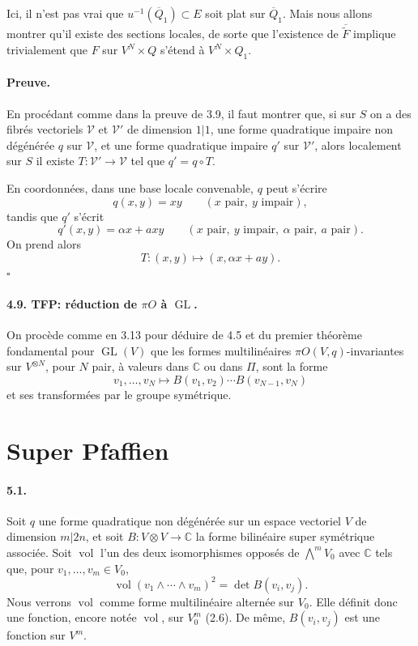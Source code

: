 \documentclass[11pt]{article}
\newcommand{\C}{\mathbb C}
\newcommand{\GL}{\operatorname{GL}}
\newcommand{\barQ}{\overline Q}
\begin{document}
Ici, il n'est pas vrai que $u^{-1}(\barQ_1)\subset E$ soit plat sur $\barQ_1$. Mais nous allons montrer qu'il existe des sections locales, de sorte que l'existence de $\overline{\widetilde F}$ implique trivialement que $F$ sur $V^N\times Q$ s'étend à $V^N\times Q_1$.

\paragraph{Preuve.}
En procédant comme dans la preuve de 3.9, il faut montrer que, si sur $S$ on a des fibrés vectoriels $\mathcal V$ et $\mathcal V'$ de dimension $1|1$, une forme quadratique impaire non dégénérée $q$ sur $\mathcal V$, et une forme quadratique impaire $q'$ sur $\mathcal V'$, alors localement sur $S$ il existe $T:\mathcal V'\to\mathcal V$ tel que $q'=q\circ T$.

En coordonnées, dans une base locale convenable, $q$ peut s'écrire
\[
q(x,y)=xy\qquad (x\text{ pair},\ y\text{ impair}),
\]
tandis que $q'$ s'écrit
\[
q'(x,y)=\alpha x+axy\qquad (x\text{ pair},\ y\text{ impair},\ \alpha\text{ pair},\ a\text{ pair}).
\]
On prend alors
\[
T:(x,y)\longmapsto (x,\alpha x+ay).
\]
\hfill $\square$

\paragraph{4.9. TFP: réduction de $\pi O$ à $\GL$.}
On procède comme en 3.13 pour déduire de 4.5 et du premier théorème fondamental pour $\GL(V)$ que les formes multilinéaires $\pi O(V,q)$-invariantes sur $V^{\otimes N}$, pour $N$ pair, à valeurs dans $\C$ ou dans $\Pi$, sont la forme
\[
v_1,\ldots,v_N\longmapsto B(v_1,v_2)\cdots B(v_{N-1},v_N)
\]
et ses transformées par le groupe symétrique.

\section{Super Pfaffien}

\paragraph{5.1.}
Soit $q$ une forme quadratique non dégénérée sur un espace vectoriel $V$ de dimension $m|2n$, et soit $B:V\otimes V\to\C$ la forme bilinéaire super symétrique associée. Soit $\operatorname{vol}$ l'un des deux isomorphismes opposés de $\bigwedge^m V_0$ avec $\C$ tels que, pour $v_1,\ldots,v_m\in V_0$,
\begin{equation}
\label{eq:511}
\operatorname{vol}(v_1\wedge\cdots\wedge v_m)^2=\det B(v_i,v_j).
\end{equation}
Nous verrons $\operatorname{vol}$ comme forme multilinéaire alternée sur $V_0$. Elle définit donc une fonction, encore notée $\operatorname{vol}$, sur $V_0^m$ (2.6). De même, $B(v_i,v_j)$ est une fonction sur $V^m$.
\end{document}
